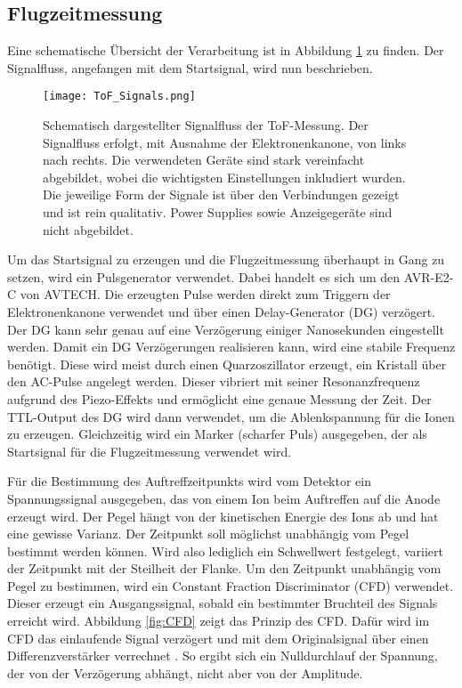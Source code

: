 \subsection{Flugzeitmessung}
Eine schematische Übersicht der Verarbeitung ist in Abbildung \ref{fig:ToF} zu finden. Der Signalfluss, angefangen mit dem Startsignal, wird nun beschrieben.
\begin{figure} 
    \centering
    \texttt{[image: ToF\_Signals.png]}
    \caption[Schematisch dargestellter Signalfluss der ToF-Messung]{Schematisch dargestellter Signalfluss der ToF-Messung. Der Signalfluss erfolgt, mit Ausnahme der Elektronenkanone, von links nach rechts. Die verwendeten Geräte sind stark vereinfacht abgebildet, wobei die wichtigsten Einstellungen inkludiert wurden. Die jeweilige Form der Signale ist über den Verbindungen gezeigt und ist rein qualitativ. Power Supplies sowie Anzeigegeräte sind nicht abgebildet.}
    \label{fig:ToF} 
\end{figure}
Um das Startsignal zu erzeugen und die Flugzeitmessung überhaupt in Gang zu setzen, wird ein Pulsgenerator verwendet. Dabei handelt es sich um den AVR-E2-C von AVTECH. Die erzeugten Pulse werden direkt zum Triggern der Elektronenkanone verwendet und über einen Delay-Generator (DG) verzögert. Der DG kann sehr genau auf eine Verzögerung einiger Nanosekunden eingestellt werden. Damit ein DG Verzögerungen realisieren kann, wird eine stabile Frequenz benötigt. Diese wird meist durch einen Quarzoszillator erzeugt, ein Kristall über den AC-Pulse angelegt werden. Dieser vibriert mit seiner Resonanzfrequenz aufgrund des Piezo-Effekts und ermöglicht eine genaue Messung der Zeit. Der TTL-Output des DG wird dann verwendet, um die Ablenkspannung für die Ionen zu erzeugen. Gleichzeitig wird ein Marker (scharfer Puls) ausgegeben, der als Startsignal für die Flugzeitmessung verwendet wird.

Für die Bestimmung des Auftreffzeitpunkts wird vom Detektor ein Spannungssignal ausgegeben, das von einem Ion beim Auftreffen auf die Anode erzeugt wird.  Der Pegel hängt von der kinetischen Energie des Ions ab und hat eine gewisse Varianz. Der Zeitpunkt soll möglichst unabhängig vom Pegel bestimmt werden können. Wird also lediglich ein Schwellwert festgelegt, variiert der Zeitpunkt mit der Steilheit der Flanke. Um den Zeitpunkt unabhängig vom Pegel zu bestimmen, wird ein Constant Fraction Discriminator (CFD) verwendet. Dieser erzeugt ein Ausgangssignal, sobald ein bestimmter Bruchteil des Signals erreicht wird. Abbildung \ref{fig:CFD} zeigt das Prinzip des CFD. Dafür wird im CFD das einlaufende Signal verzögert und mit dem Originalsignal über einen Differenzverstärker verrechnet \cite{CFD}. So ergibt sich ein Nulldurchlauf der Spannung, der von der Verzögerung abhängt, nicht aber von der Amplitude. 


